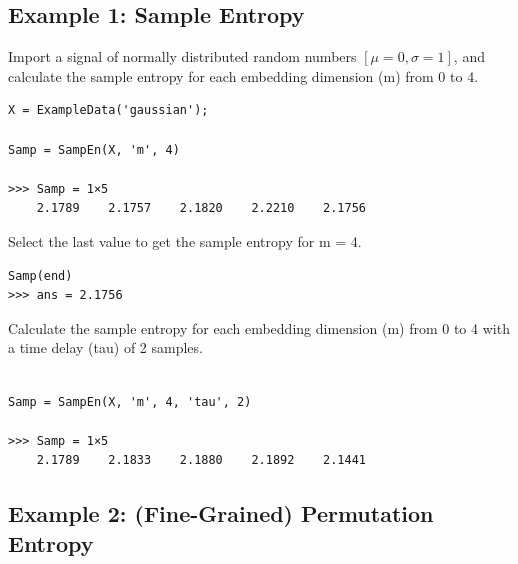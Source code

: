 \documentclass[12pt, a4paper, titlepage, openany]{book}
\begin{document}
\subsection{\normalsize Example 1: \hspace{15mm} Sample Entropy}

Import a signal of normally distributed random numbers $[\mu = 0, \sigma = 1]$, and calculate the sample entropy for each embedding dimension (m) from 0 to 4.
\begin{verbatim}
X = ExampleData('gaussian');

Samp = SampEn(X, 'm', 4)

>>> Samp = 1×5
    2.1789    2.1757    2.1820    2.2210    2.1756
\end{verbatim}
Select the last value to get the sample entropy for m = 4.
\begin{verbatim}
Samp(end)
>>> ans = 2.1756
\end{verbatim}
Calculate the sample entropy for each embedding dimension (m) from 0 to 4 with a time delay (tau) of 2 samples.
\begin{verbatim}

Samp = SampEn(X, 'm', 4, 'tau', 2)

>>> Samp = 1×5
    2.1789    2.1833    2.1880    2.1892    2.1441
\end{verbatim}

\newpage
\subsection{\normalsize Example 2: \hspace{15mm} (Fine-Grained) Permutation Entropy}
\end{document}
